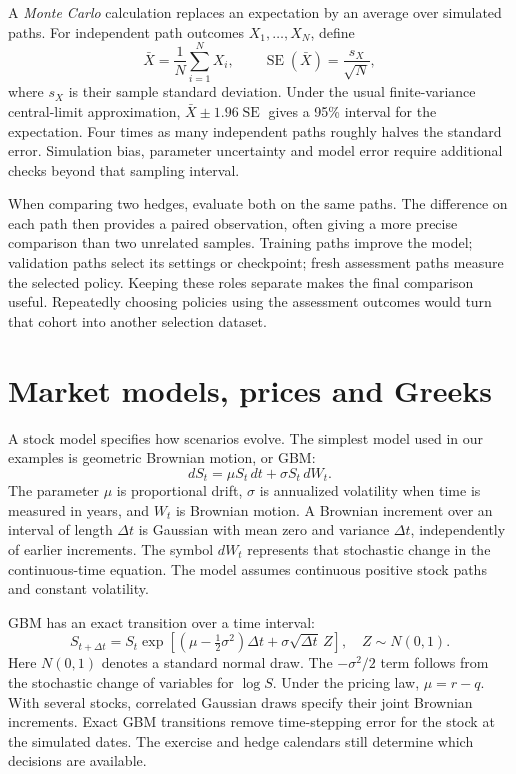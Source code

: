 \documentclass[8pt]{strategynet-journal}
\begin{document}
\begin{SNcolumns}
A \emph{Monte Carlo} calculation replaces an expectation by an average over
simulated paths. For independent path outcomes $X_1,\ldots,X_N$, define
\[
 \bar X=\frac1N\sum_{i=1}^N X_i,\qquad
 \operatorname{SE}(\bar X)=\frac{s_X}{\sqrt N},
\]
where $s_X$ is their sample standard deviation. Under the usual finite-variance
central-limit approximation, $\bar X\pm1.96\operatorname{SE}$ gives a 95\%
interval for the expectation. Four times as many independent paths roughly
halves the standard error. Simulation bias, parameter uncertainty and model
error require additional checks beyond that sampling interval.

When comparing two hedges, evaluate both on the same paths. The difference
on each path then provides a paired observation, often giving a more precise
comparison than two unrelated samples. Training paths improve the model;
validation paths select its settings or checkpoint; fresh assessment paths
measure the selected policy. Keeping these roles separate makes the final
comparison useful. Repeatedly choosing policies using the assessment outcomes
would turn that cohort into another selection dataset.

\section{Market models, prices and Greeks}
A stock model specifies how scenarios evolve. The simplest model used in
our examples is geometric Brownian motion, or GBM:
\[
 dS_t=\mu S_t\,dt+\sigma S_t\,dW_t.
\]
The parameter $\mu$ is proportional drift, $\sigma$ is annualized volatility
when time is measured in years, and $W_t$
is Brownian motion. A Brownian increment over an interval of length $\Delta t$
is Gaussian with mean zero and variance $\Delta t$, independently of earlier
increments. The symbol $dW_t$ represents that stochastic change in the
continuous-time equation. The model assumes continuous positive stock paths
and constant volatility.

GBM has an exact transition over a time interval:
\[
 S_{t+\Delta t}=S_t\exp\!\left[
   (\mu-\tfrac12\sigma^2)\Delta t+\sigma\sqrt{\Delta t}\,Z\right],
 \quad Z\sim N(0,1).
\]
Here $N(0,1)$ denotes a standard normal draw. The $-\sigma^2/2$ term follows
from the stochastic change of variables for $\log S$. Under the pricing law,
$\mu=r-q$. With several stocks, correlated Gaussian draws specify their joint
Brownian increments. Exact GBM transitions remove time-stepping error for the
stock at the simulated dates. The exercise and hedge calendars still determine
which decisions are available.


\end{SNcolumns}
\end{document}
